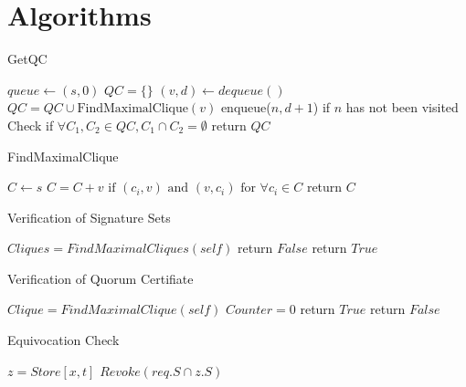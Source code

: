 \section*{Algorithms}
%
%
\begin{algorithm}
  \caption{GetQC}
  \SetAlgoNoLine
  $queue \leftarrow {(s, 0)}$\;
  $QC = \{\}$\;
  {
    $(v, d) \leftarrow dequeue()$\;
    $QC = QC \cup \text{FindMaximalClique}(v)$\;
    {
      enqueue($n, d + 1$) if $n$ has not been visited\;
    }
  }
  Check if $\forall C_1, C_2 \in QC, C_1 \cap C_2 = \emptyset$\;
  return $QC$
\end{algorithm}

\begin{algorithm}
  \caption{FindMaximalClique}
  \SetAlgoNoLine
  $C \leftarrow {s}$\;
  {
    $C = C + {v} \text{ if } (c_i, v) \text{ and } (v, c_i)
    \text{ for } \forall c_i \in C$\;
  }
  return $C$
\end{algorithm}

\begin{algorithm}
  \caption{Verification of Signature Sets}
  \SetAlgoNoLine
  $Cliques = FindMaximalCliques(self)$\;
  {
    {
      return $False$\;
    }
  }
  return $True$\;
\end{algorithm}

\begin{algorithm}
  \caption{Verification of Quorum Certifiate}
  \SetAlgoNoLine
  $Clique = FindMaximalClique(self)$\;
  $Counter = 0$\;
  {
  }
  {
    return $True$\;
  }{
    return $False$\;
  }
\end{algorithm}

\begin{algorithm}
  \caption{Equivocation Check}
  \SetAlgoNoLine
  $z = Store[x, t]$\;
  {
    $Revoke(req.S \cap z.S)$\;
  }
\end{algorithm}

